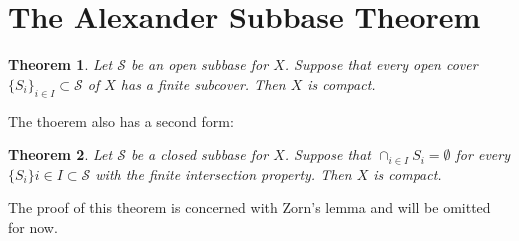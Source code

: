 \documentclass[11pt,a4paper]{article}
\theoremstyle{definition}
\theoremstyle{plain}
\newtheorem{theorem}{Theorem}[section]
\begin{document}
	\newpage
	
	\section{The Alexander Subbase Theorem}
	\begin{theorem}
		Let $\mathcal{S}$ be an open subbase for $X$. Suppose that every 
		open cover $\{S_i\}_{i \in I} \subset \mathcal{S}$ of $X$ has a 
		finite subcover. Then $X$ is compact.
	\end{theorem}
	The thoerem also has a second form:
	\begin{theorem}
	Let $\mathcal{S}$ be a closed subbase for $X$. Suppose that 
	$\cap_{i \in I}{S_i} = \emptyset$ for every 
	$\{S_i\}{i \in I} \subset \mathcal{S}$ with the finite intersection 
	property. Then $X$ is compact.
	\end{theorem}
	The proof of this theorem is concerned with Zorn's lemma and will
	be omitted for now.
	
	\newpage
	
\end{document}
